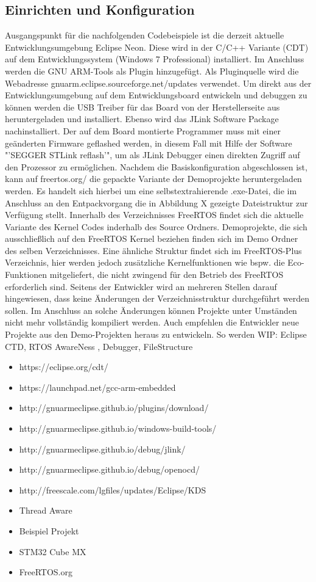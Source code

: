\subsection{Einrichten und Konfiguration}
\label{sec:Einrichtung und Konfiguration}
Ausgangspunkt für die nachfolgenden Codebeispiele ist die derzeit aktuelle Entwicklungsumgebung Eclipse Neon. Diese wird in der C/C++ Variante (CDT) auf dem Entwicklungssystem (Windows 7 Professional) installiert. Im Anschluss werden die GNU ARM-Tools als Plugin hinzugefügt. Als Pluginquelle wird die Webadresse gnuarm.eclipse.sourceforge.net/updates verwendet. Um direkt aus der Entwicklungsumgebung auf dem Entwicklungsboard entwickeln und debuggen zu können werden die USB Treiber für das Board von der Herstellerseite aus heruntergeladen und installiert. Ebenso wird das JLink Software Package nachinstalliert. Der auf dem Board montierte Programmer muss mit einer geänderten Firmware geflashed werden, in diesem Fall mit Hilfe der Software "'SEGGER STLink reflash'", um als JLink Debugger einen direkten Zugriff auf den Prozessor zu ermöglichen.
Nachdem die Basiskonfiguration abgeschlossen ist, kann auf freertos.org/ die gepackte Variante der Demoprojekte heruntergeladen werden. Es handelt sich hierbei um eine selbstextrahierende .exe-Datei, die im Anschluss an den Entpackvorgang die in Abbildung X gezeigte Dateistruktur zur Verfügung stellt.
Innerhalb des Verzeichnisses FreeRTOS findet sich die aktuelle Variante des Kernel Codes inderhalb des Source Ordners. Demoprojekte, die sich ausschließlich auf den FreeRTOS Kernel beziehen finden sich im Demo Ordner des selben Verzeichnisses. Eine ähnliche Struktur findet sich im FreeRTOS-Plus Verzeichnis, hier werden jedoch zusätzliche Kernelfunktionen wie bspw. die Eco-Funktionen mitgeliefert, die nicht zwingend für den Betrieb des FreeRTOS erforderlich sind. 
Seitens der Entwickler wird an mehreren Stellen darauf hingewiesen, dass keine Änderungen der Verzeichnisstruktur durchgeführt werden sollen. Im Anschluss an solche Änderungen können Projekte unter Umständen nicht mehr vollständig kompiliert werden. Auch empfehlen die Entwickler neue Projekte aus den Demo-Projekten heraus zu entwickeln. So werden 
WIP: Eclipse CTD, RTOS AwareNess , Debugger, FileStructure
\begin{itemize}
	\item https://eclipse.org/cdt/
	\item https://launchpad.net/gcc-arm-embedded
\item http://gnuarmeclipse.github.io/plugins/download/
\item http://gnuarmeclipse.github.io/windows-build-tools/
\item http://gnuarmeclipse.github.io/debug/jlink/
\item http://gnuarmeclipse.github.io/debug/openocd/
\item http://freescale.com/lgfiles/updates/Eclipse/KDS
\item Thread Aware 
\item Beispiel Projekt
\item STM32 Cube MX
\item FreeRTOS.org
\end{itemize}